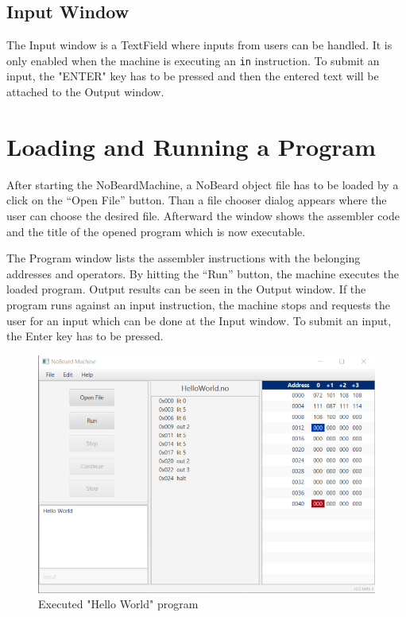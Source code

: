 \subsection{Input Window}
The Input window is a TextField where inputs from users can be handled. It is only enabled when the machine is executing an \lstinline$in$ instruction. To submit an input, the "ENTER" key has to be pressed and then the entered text will be attached to the Output window.

\section{Loading and Running a Program}
After starting the NoBeardMachine, a NoBeard object file has to be loaded by a click on the “Open File” button. Than a file chooser dialog appears where the user can choose the desired file. Afterward the window shows the assembler code and the title of the opened program which is now  executable.

The Program window lists the assembler instructions with the belonging addresses and operators.  By hitting the “Run” button, the machine executes the loaded program. Output results can be seen in the Output window. If the program runs against an input instruction, the machine stops and requests the user for an input which can be done at the Input window. To submit an input, the Enter key has to be pressed. 
\begin{figure}[h] 
	\centering
	\includegraphics[scale=.85]{images/screenshot-1.png}
	\caption{Executed "Hello World" program}
\end{figure}


